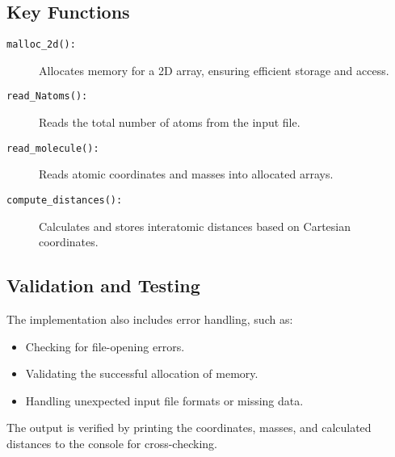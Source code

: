 \subsection{Key Functions}
\begin{description}
    \item[\texttt{malloc\_2d():}] Allocates memory for a 2D array, ensuring efficient storage and access.
    \item[\texttt{read\_Natoms():}] Reads the total number of atoms from the input file.
    \item[\texttt{read\_molecule():}] Reads atomic coordinates and masses into allocated arrays.
    \item[\texttt{compute\_distances():}] Calculates and stores interatomic distances based on Cartesian coordinates.
\end{description}

\subsection{Validation and Testing}
The implementation also includes error handling, such as:
\begin{itemize}
    \item Checking for file-opening errors.
    \item Validating the successful allocation of memory.
    \item Handling unexpected input file formats or missing data.
\end{itemize}

The output is verified by printing the coordinates, masses, and calculated distances to the console for cross-checking.
